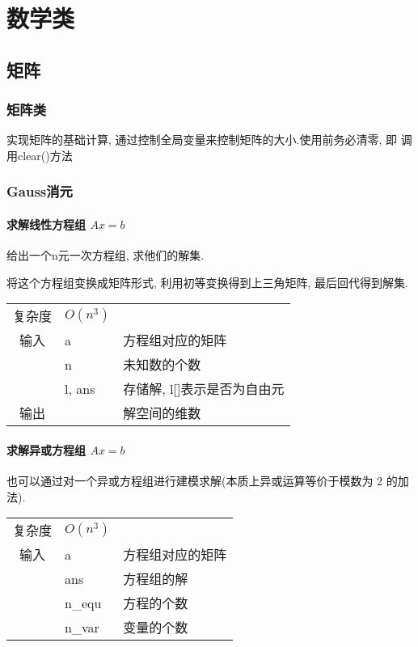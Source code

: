 \clearpage\chapter{数学类}

\section{矩阵}


    \subsection{矩阵类}\small
实现矩阵的基础计算, 通过控制全局变量来控制矩阵的大小.使用前务必清零, 即
调用clear()方法



    \subsection{Gauss消元}\small
        \subsubsection{求解线性方程组 $Ax = b$}\small
给出一个n元一次方程组, 求他们的解集.

将这个方程组变换成矩阵形式, 利用初等变换得到上三角矩阵, 最后回代得到解集.
\begin{longtable}{|c|l|l|}
复杂度 & $O(n^3)$ & \\
输入 & a & 方程组对应的矩阵 \\
 & n & 未知数的个数 \\
 & l, ans & 存储解, l[]表示是否为自由元 \\
输出 & & 解空间的维数 \\
\end{longtable}


        \subsubsection{求解异或方程组 $Ax = b$}\small
也可以通过对一个异或方程组进行建模求解(本质上异或运算等价于模数为 2 的加法).
\begin{longtable}{|c|l|l|}
复杂度 & $O(n^3)$ & \\
输入 & a & 方程组对应的矩阵 \\
 & ans & 方程组的解 \\
 & n\_equ & 方程的个数 \\
 & n\_var & 变量的个数 \\
\end{longtable}



